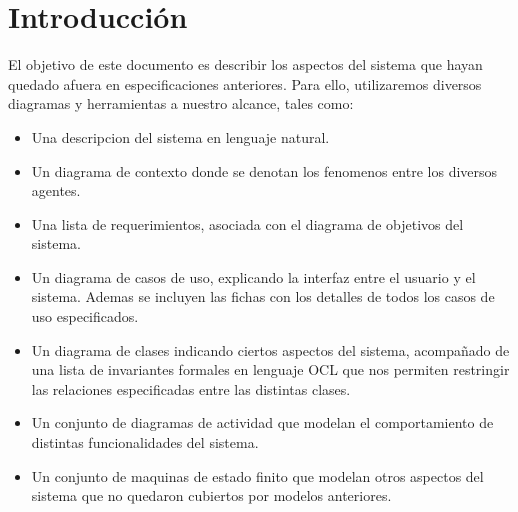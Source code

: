 \section{Introducción}
El objetivo de este documento es describir los aspectos del sistema que hayan quedado afuera en especificaciones anteriores. Para ello, utilizaremos diversos diagramas y herramientas a nuestro alcance, tales como:
\begin{itemize}
	\item Una descripcion del sistema en lenguaje natural.
	\item Un diagrama de contexto donde se denotan los fenomenos entre los diversos agentes.
	\item Una lista de requerimientos, asociada con el diagrama de objetivos del sistema.
	\item Un diagrama de casos de uso, explicando la interfaz entre el usuario y el sistema. Ademas se incluyen las fichas con los detalles de todos los casos de uso especificados.
	\item Un diagrama de clases indicando ciertos aspectos del sistema, acompañado de una lista de invariantes formales en lenguaje OCL que nos permiten restringir las relaciones especificadas entre las distintas clases.
	\item Un conjunto de diagramas de actividad que modelan el comportamiento de distintas funcionalidades del sistema.
	\item Un conjunto de maquinas de estado finito que modelan otros aspectos del sistema que no quedaron cubiertos por modelos anteriores.
\end{itemize}